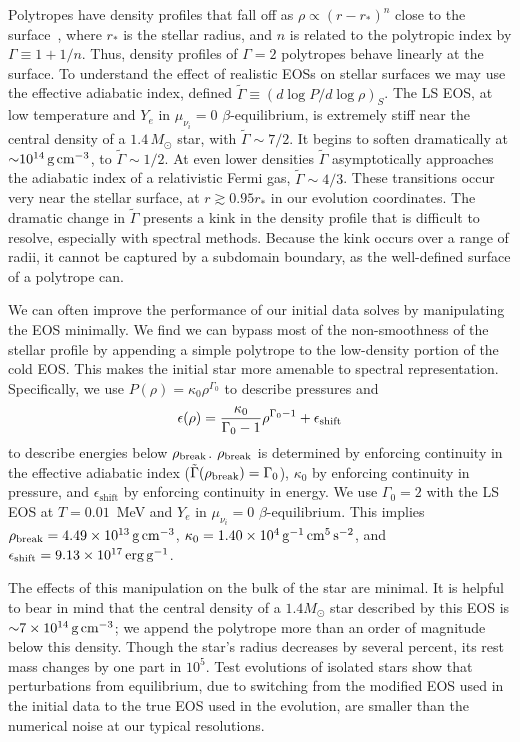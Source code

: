 Polytropes have density profiles that
fall off as $\rho \propto (r-r_{*})^n$ close to the surface~\citep{Gundlach:2009ft},
where $r_{*}$ is the stellar radius, and
$n$ is related to the polytropic index by $\Gamma \equiv 1+1/n$.
Thus, density profiles of $\Gamma=2$ polytropes behave linearly at the surface.
To understand the effect of realistic EOSs on stellar surfaces
we may use the effective adiabatic index, defined
$\tilde{\Gamma} \equiv (d\log P/d\log \rho)_S$.
The LS EOS, at low temperature and $Y_e$ in $\mu_{\nu_i}=0$ $\beta$-equilibrium,
is extremely stiff near the central density of a $1.4\,M_{\odot}$ star, with
$\tilde{\Gamma} \sim 7/2$.
It begins to soften dramatically at $\mathord{\sim}10^{14}\,\text{g}\,\text{cm}^{-3}$,
to $\tilde{\Gamma} \sim 1/2$.
At even lower densities $\tilde{\Gamma}$
asymptotically approaches the adiabatic index of a relativistic
Fermi gas, $\tilde{\Gamma} \sim 4/3$.
These transitions occur very near the stellar surface,
at $r \gtrsim 0.95 r_{*}$ in our evolution coordinates.
The dramatic change in $\tilde{\Gamma}$ presents a kink in the density profile
that is difficult to resolve, especially with spectral methods.
Because the kink occurs over a range of radii,
it cannot be captured by a subdomain boundary,
as the well-defined surface of a polytrope can.

We can often improve the performance of our initial data solves
by manipulating the EOS minimally.
We find we can bypass most of the non-smoothness of the stellar profile
by appending a simple polytrope to the low-density portion of the cold EOS.
This makes the initial star more amenable to spectral representation.
Specifically, we use $P(\rho)=\kappa_0 \rho^{\Gamma_0}$
to describe pressures and
\begin{equation}
\epsilon(\rho) = \frac{\kappa_0}{\Gamma_0-1} \rho^{\Gamma_0-1} + \epsilon_{\rm shift} \nonumber
\end{equation}
to describe energies below $\rho_{\rm break}$.
$\rho_{\rm break}$ is determined by enforcing continuity in the effective
adiabatic index ($\tilde{\Gamma}(\rho_{\rm break})=\Gamma_0$),
$\kappa_0$ by enforcing continuity in pressure,
and $\epsilon_{\text{shift}}$ by enforcing continuity in energy.
We use $\Gamma_0=2$ with the LS EOS at $T=0.01$~MeV and $Y_e$ in
$\mu_{\nu_i}=0$ $\beta$-equilibrium.
This implies $\rho_{\rm break} = 4.49 \times 10^{13}\,\rm g\, cm^{-3}$,
$\kappa_0 = 1.40 \times 10^{4}\,\rm g^{-1}\,cm^{5}\,s^{-2}$,
and $\epsilon_{\rm shift} = 9.13 \times 10^{17}\,\rm erg\, g^{-1}$.

The effects of this manipulation on the bulk of the star are minimal.
It is helpful to bear in mind that the central density of a $1.4 M_{\odot}$
star described by this EOS is $\mathord{\sim} 7 \times 10^{14}\,\text{g}\,\text{cm}^{-3}$;
we append the polytrope more than an order of magnitude below this density.
Though the star's radius decreases by several percent, its rest mass changes
by one part in $10^5$. Test evolutions of isolated stars show that perturbations
from equilibrium, due to switching from the modified EOS used in the initial data
to the true EOS used in the evolution, are smaller than the numerical noise at
our typical resolutions.

